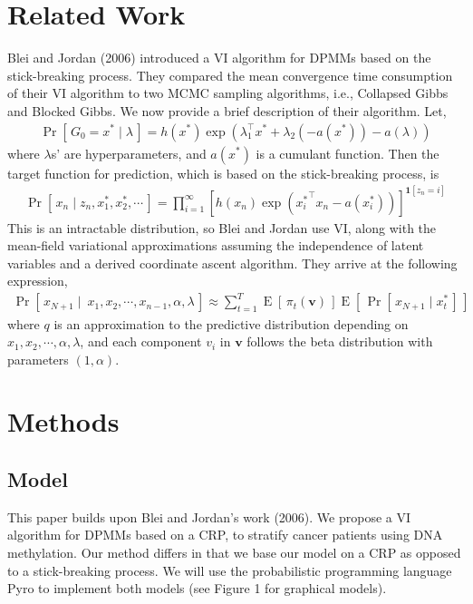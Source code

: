 \documentclass{article}
\newcommand{\prob}[1]{\operatorname{Pr}\left[\,#1\,\right]}
\newcommand{\expect}[1]{\operatorname{E}\left[\,#1\,\right]}
\def\cond{\; | \;}
\begin{document}
\section{Related Work}
Blei and Jordan (2006) introduced a VI algorithm for DPMMs based on the stick-breaking process. They compared the mean convergence time consumption of their VI algorithm to two MCMC sampling algorithms, i.e., Collapsed Gibbs and Blocked Gibbs. We now provide a brief description of their algorithm. Let,
\begin{align*}
\prob{G_0 = x^*\cond \lambda} = h(x^*)\exp(\lambda_1^\top x^* + \lambda_2(-a(x^*)) - a(\lambda))
\end{align*}
where $\lambda$s' are hyperparameters,  and $a(x^*)$ is a cumulant function.  Then the target function for prediction, which is based on the stick-breaking process, is 
\begin{align*}
\prob{x_n\cond z_n, x_1^*, x_2^*, \cdots} = \prod_{i=1}^\infty [h(x_n)\exp({x_i^*}^\top x_n - a(x_i^*))]^{\mathbf{1}[z_n = i]}
\end{align*}
This is an intractable distribution, so Blei and Jordan use VI, along with the mean-field variational approximations assuming the independence of latent variables and a derived coordinate ascent algorithm. They arrive at the following expression,
\begin{align*}
\prob{x_{N+1}\cond \ x_1, x_2, \cdots, x_{n-1}, \alpha, \lambda}\approx \sum_{t=1}^T \expect{\pi_t(\mathbf{v})}\expect{\prob{x_{N+1}\cond x_t^*}}
\end{align*}
where $q$ is an approximation to the predictive distribution depending on $x_1, x_2, \cdots, \alpha, \lambda$,  and each component $v_i$ in $\mathbf{v}$ follows the beta distribution with parameters $(1, \alpha)$.

\section{Methods}
\subsection{Model}
This paper builds upon Blei and Jordan's work (2006). We propose a VI algorithm for DPMMs based on a CRP, to stratify cancer patients using DNA methylation. Our method differs in that we base our model on a CRP as opposed to a stick-breaking process. We will use the probabilistic programming language Pyro to implement both models (see Figure 1 for graphical models).
\end{document}
